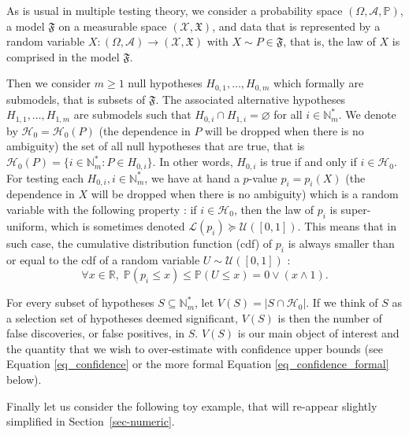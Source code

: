 \documentclass[
  11pt,
  a4paper,
]{article}
\theoremstyle{plain}
\theoremstyle{definition}
\theoremstyle{plain}
\theoremstyle{definition}
\theoremstyle{plain}
\theoremstyle{remark}
\begin{document}
As is usual in multiple testing theory, we consider a probability space
\((\Omega,\mathcal A, \mathbb P)\), a model \(\mathfrak{F}\) on a
measurable space \((\mathcal{X},\mathfrak{X})\), and data that is
represented by a random variable
\(X:(\Omega,\mathcal A)\to(\mathcal{X},\mathfrak{X})\) with
\(X\sim P\in \mathfrak{F}\), that is, the law of \(X\) is comprised in
the model \(\mathfrak{F}\).

Then we consider \(m\geq1\) null hypotheses \(H_{0,1}, \dotsc, H_{0,m}\)
which formally are submodels, that is subsets of \(\mathfrak{F}\). The
associated alternative hypotheses \(H_{1,1}, \dotsc, H_{1,m}\) are
submodels such that \(H_{0,i}\cap H_{1,i}=\varnothing\) for all
\(i\in\mathbb{N}_m^*\). We denote by \(\mathcal{H}_0=\mathcal{H}_0(P)\)
(the dependence in \(P\) will be dropped when there is no ambiguity) the
set of all null hypotheses that are true, that is
\(\mathcal{H}_0(P)=\{i\in\mathbb{N}_m^* : P\in H_{0,i}\}\). In other
words, \(H_{0,i}\) is true if and only if \(i\in\mathcal{H}_0\). For
testing each \(H_{0,i}, i\in\mathbb{N}_m^*\), we have at hand a
\(p\)-value \(p_i=p_i(X)\) (the dependence in \(X\) will be dropped when
there is no ambiguity) which is a random variable with the following
property : if \(i\in\mathcal{H}_0\), then the law of \(p_i\) is
super-uniform, which is sometimes denoted
\(\mathcal L(p_i)\succeq \mathcal{U}([0,1])\). This means that in such
case, the cumulative distribution function (cdf) of \(p_i\) is always
smaller than or equal to the cdf of a random variable
\(U\sim \mathcal{U}([0,1])\) : \begin{equation}
\forall x \in \mathbb{R},\; \mathbb{P}\left(p_i\leq x\right)\leq \mathbb{P}\left(U\leq x\right) = 0\vee(x\wedge 1).
\label{eq_super_unif}
\end{equation}

For every subset of hypotheses \(S\subseteq\mathbb{N}_m^*\), let
\(V(S)=|S\cap\mathcal{H}_0|\). If we think of \(S\) as a selection set
of hypotheses deemed significant, \(V(S)\) is then the number of false
discoveries, or false positives, in \(S\). \(V(S)\) is our main object
of interest and the quantity that we wish to over-estimate with
confidence upper bounds (see Equation \eqref{eq_confidence} or the more
formal Equation \eqref{eq_confidence_formal} below).

Finally let us consider the following toy example, that will re-appear
slightly simplified in Section~\ref{sec-numeric}.
\end{document}
